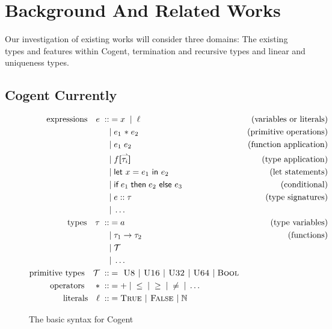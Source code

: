 \chapter{Background And Related Works}\label{ch:background}

Our investigation of existing works will consider three domains: The existing types and features
within Cogent, termination and recursive types and linear and uniqueness types.

\section{Cogent Currently}
\begin{figure}
    \centering

    \begin{align*}
    \text{expressions}\quad e\; ::&= x\;\; |\;\; \ell & \text{(variables or literals)} \\
                &|\; e_1 \text{ \textasteriskcentered }\; e_2 & \text{(primitive operations)} \\
                &|\; e_1\; e_2 & \text{(function application)} \\
                &|\; f\textbf{[}\harpoon{\tau_i}\textbf{]} & \text{(type application)} \\
                &|\; \textsf{let } x = e_1 \textsf{ in } e_2 & \text{(let statements)} \\
                &|\; \textsf{if}\; e_1\; \textsf{then}\; e_2 \textsf{ else } e_3 & \text{(conditional)} \\
                &|\; e :: \tau & \text{(type signatures)} \\
                &|\; \dots \\
        \text{types}\quad \tau\; ::&= a & \text{(type variables)} \\
              &|\; \tau_1 \rightarrow \tau_2 & \text{(functions)} \\
              &|\; \mathcal{T} \\
              &|\; \dots \\
        \text{primitive types}\quad \mathcal{T}\; ::&= \textsc{ U8 } | \textsc{ U16 } | \textsc{ U32 } | \textsc{ U64 } |\; \textsc{Bool} \\
        \text{operators \ \ \ \textasteriskcentered }\; ::&= +\; |\; \leq\; |\; \geq\; |\; \neq\; |\; \dots \\
        \text{literals}\quad \ell\; ::&= \textsc{True } | \textsc{ False } |\; \mathbb{N}  \\
    \end{align*}

    \caption{The basic syntax for Cogent~\citep{ICFPCogent}}
    \label{fig:cogentGrammar}
\end{figure}

